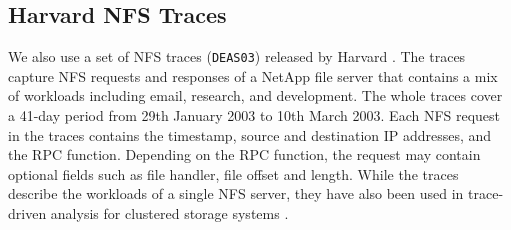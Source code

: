 \subsection{Harvard NFS Traces}  

We also use a set of NFS traces
(\texttt{DEAS03}) released by Harvard \cite{ellard04}.  The traces capture NFS
requests and responses of a NetApp file server 
that contains a mix of workloads including email, research, and development.
The whole traces cover a 41-day period from 29th January 2003 to 10th March
2003.  Each NFS request in the traces contains the timestamp, source and
destination IP addresses, and the RPC function. 
Depending on the RPC function, the request may contain optional fields such as
file handler, file offset and length.  While the traces describe the
workloads of a single NFS server, they have also been used in trace-driven
analysis for clustered storage systems \cite{abd05,hendricks06}.


